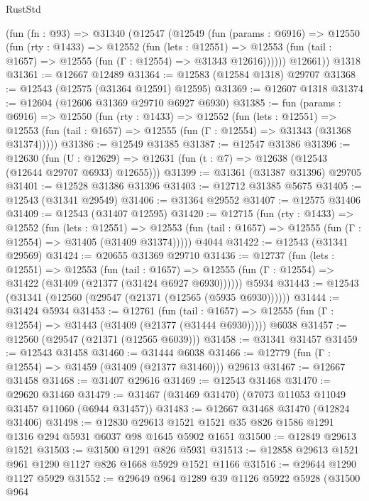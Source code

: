 \begin{lexlean}{RustStd}
\begin{coremodule}
    (fun (fn : @93) =>
    @31340
      (@12547
        (@12549
          (fun (params : @6916) =>
          @12550
            (fun (rty : @1433) =>
            @12552
              (fun (lets : @12551) =>
              @12553 (fun (tail : @1657) => @12555 (fun (Γ : @12554) => @31343 @12616))))))
        @12661))
    @1318
@31361 := @12667 @12489
@31364 := @12583 (@12584 @1318) @29707
@31368 := @12543 (@12575 (@31364 @12591) @12595)
@31369 := @12607 @1318
@31374 := @12604 (@12606 @31369 @29710 @6927 @6930)
@31385 := fun (params : @6916) =>
  @12550
    (fun (rty : @1433) =>
    @12552
      (fun (lets : @12551) =>
      @12553 (fun (tail : @1657) => @12555 (fun (Γ : @12554) => @31343 (@31368 @31374)))))
@31386 := @12549 @31385
@31387 := @12547 @31386
@31396 := @12630
    (fun (U : @12629) => @12631 (fun (t : @7) => @12638 (@12543 (@12644 @29707 @6933) @12655)))
@31399 := @31361 (@31387 @31396) @29705
@31401 := @12528 @31386 @31396
@31403 := @12712 @31385 @5675
@31405 := @12543 (@31341 @29549)
@31406 := @31364 @29552
@31407 := @12575 @31406
@31409 := @12543 (@31407 @12595)
@31420 := @12715
    (fun (rty : @1433) =>
    @12552
      (fun (lets : @12551) =>
      @12553 (fun (tail : @1657) => @12555 (fun (Γ : @12554) => @31405 (@31409 @31374)))))
    @4044
@31422 := @12543 (@31341 @29569)
@31424 := @20655 @31369 @29710
@31436 := @12737
    (fun (lets : @12551) =>
    @12553
      (fun (tail : @1657) =>
      @12555 (fun (Γ : @12554) => @31422 (@31409 (@21377 (@31424 @6927 @6930))))))
    @5934
@31443 := @12543 (@31341 (@12560 (@29547 (@21371 (@12565 (@5935 @6930))))))
@31444 := @31424 @5934
@31453 := @12761
    (fun (tail : @1657) => @12555 (fun (Γ : @12554) => @31443 (@31409 (@21377 (@31444 @6930)))))
    @6038
@31457 := @12560 (@29547 (@21371 (@12565 @6039)))
@31458 := @31341 @31457
@31459 := @12543 @31458
@31460 := @31444 @6038
@31466 := @12779 (fun (Γ : @12554) => @31459 (@31409 (@21377 @31460))) @29613
@31467 := @12667 @31458
@31468 := @31407 @29616
@31469 := @12543 @31468
@31470 := @29620 @31460
@31479 := @31467 (@31469 @31470) (@7073 @11053 @11049 @31457 @11060 (@6944 @31457))
@31483 := @12667 @31468 @31470 (@12824 @31406)
@31498 := @12830
    @29613
    @1521
    @1521
    @35
    @826
    @1586
    @1291
    @1316
    @294
    @5931
    @6037
    @98
    @1645
    @5902
    @1651
@31500 := @12849 @29613 @1521
@31503 := @31500 @1291 @826 @5931
@31513 := @12858 @29613 @1521 @961 @1290 @1127 @826 @1668 @5929 @1521 @1166
@31516 := @29644 @1290 @1127 @5929
@31552 := @29649
    @964
    @1289
    @39
    @1126
    @5922
    @5928
    (@31500
      @964

\end{coremodule}
\end{lexlean}
